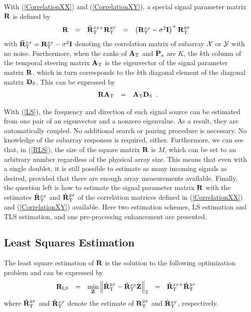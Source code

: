 \documentclass[a4paper,10pt,fleqn,twocolumn]{IEEEtran}
\newcommand{\bA}{{\mathbf A}}
\newcommand{\bD}{{\bf D}}
\newcommand{\bZ}{{\bf Z}}
\newcommand{\bP}{{\bf P}}
\newcommand{\bI}{{\bf I}}
\newcommand{\bR}{{\bf R}}
\begin{document}
With (\ref{CorrelationXX}) and (\ref{CorrelationXY}), a special
signal parameter matrix $\bR$ is defined by
\begin{equation}
\begin{array}{rcccl}
\bR&=&\mathbf{\bar{R}}_{\rm T}^{xx+}\bR_{\rm
T}^{yx}&=&\left(\bR_{\rm T}^{xx}-\sigma^2\bI\right)^{+}\bR_{\rm
T}^{yx}
\end{array}\label{RLS}
\end{equation}
\noindent with $\mathbf{\bar{R}}_{\rm T}^{xx}=\bR_{\rm
T}^{xx}-\sigma^2\bI$ denoting the correlation matrix of subarray
$\cal X$ or $\cal Y$ with no noise. Furthermore, when the ranks of
$\bA_{\rm T}$ and $\bP_{s}$ are $K$, the $k$th column of the
temporal steering matrix $\bA_{\rm T}$ is the eigenvector of the
signal parameter matrix $\bR$, which in turn corresponds to the
$k$th diagonal element of the diagonal matrix $\bD_{\rm S}$. This
can be expressed by
\begin{equation}
\begin{array}{rcl}
\bR\bA_{\rm T}&=&\bA_{\rm T}\bD_{\rm S}
\end{array}.\label{LS}
\end{equation}

With (\ref{LS}), the frequency and direction of each signal source
can be estimated from one pair of an eigenvector and a nonzero
eigenvalue. As a result, they are automatically coupled. No
additional search or pairing procedure is necessary. No knowledge
of the subarray responses is required, either. Furthermore, we can
see that, in (\ref{RLS}), the size of the square matrix $\bR$ is
$M$, which can be set to an arbitrary number regardless of the
physical array size. This means that even with a single doublet,
it is still possible to estimate as many incoming signals as
desired, provided that there are enough array measurements
available. Finally, the question left is how to estimate the
signal parameter matrix $\bR$ with the estimates $\tilde{\bR}_{\rm
T}^{xx}$ and $\hat{\bR}_{\rm T}^{yx}$ of the correlation matrices
defined in (\ref{CorrelationXX}) and (\ref{CorrelationXY})
available. Here two estimation schemes, LS estimation and TLS
estimation, and one pre-processing enhancement are presented.
\subsection{Least Squares Estimation}
The least square estimation of $\bR$ is the solution to the
following optimization problem and can be expressed by
\begin{equation}
\begin{array}{rcccl}
\bR_{\rm LS }&=&\min\limits_{\bZ}\left\|\hat{\bR}_{ \rm
T}^{yx}-\tilde{\bR}_{\rm T}^{xx}\bZ\right\|_2&=&\tilde{\bR}_{\rm
T}^{xx+}\hat{\bR}_{ \rm T}^{yx}
\end{array}
\label{LS1}
\end{equation}
\noindent where $\hat{\bR}_{\rm T}^{yx}$ and $\tilde{\bR}_{\rm
T}^{xx}$ denote the estimate of ${\bR}_{\rm T}^{yx}$ and
$\bar{\bR}_{\rm T}^{xx}$, respectively.
\end{document}
